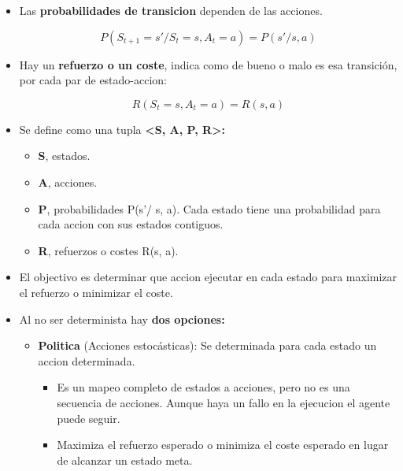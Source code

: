 \documentclass[12pt, twoside, openright]{report} %
\begin{document}
\begin{itemize}
\begin{itemize}
    \item Las \textbf{probabilidades de transicion} dependen de las
      acciones.
      
	  $$P(S_{t+1} = s' / S_t = s, A_t = a)= P(s'/s, a)$$
    \item Hay un \textbf{refuerzo o un coste}, indica como de bueno o malo
      es esa transición, por cada par de estado-accion:

	  $$R(S_t = s, A_t = a) = R(s, a)$$
      
    \item Se define como una tupla \textbf{\textless S, A, P,
      R\textgreater:}
      

      \begin{itemize}
      \item \textbf{S}, estados.
        
      \item \textbf{A}, acciones.
        
      \item \textbf{P}, probabilidades P(s'/ s, a). Cada estado tiene una
        probabilidad para cada accion con sus estados contiguos.
        
      \item \textbf{R}, refuerzos o costes R(s, a).
        
      \end{itemize}
    \item El objectivo es determinar que accion ejecutar en cada estado para
      maximizar el refuerzo o minimizar el coste.
      
    \item Al no ser determinista hay \textbf{dos opciones:}
      

      \begin{itemize}
      \item \textbf{Politica} (Acciones estocásticas): Se determinada para
        cada estado un accion determinada.
        

        \begin{itemize}
        \item Es un mapeo completo de estados a acciones, pero no es una
          secuencia de acciones. Aunque haya un fallo en la ejecucion el
          agente puede seguir.
          
        \item Maximiza el refuerzo esperado o minimiza el coste esperado en
          lugar de alcanzar un estado meta.
          

\end{itemize}
\end{itemize}
\end{itemize}
\end{itemize}
\end{document}
